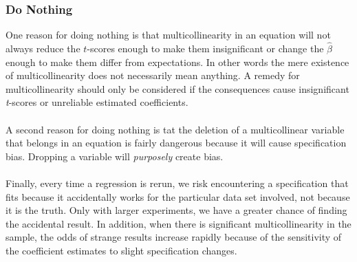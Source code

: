 \documentclass[11pt]{article}
\begin{document}
\subsubsection{Do Nothing}
One reason for doing nothing is that multicollinearity in an equation will not always reduce the $t$-scores enough to make them insignificant or change the $\hat{\beta}$ enough to make them differ from expectations. In other words the mere existence of multicollinearity does not necessarily mean anything. A remedy for multicollinearity should only be considered if the consequences cause insignificant \textit{t}-scores or unreliable estimated coefficients. \\ \\
A second reason for doing nothing is tat the deletion of a multicollinear variable that belongs in an equation is fairly dangerous because it will cause specification bias. Dropping a variable will \textit{purposely} create bias. \\ \\
Finally, every time a regression is rerun, we risk encountering a specification that fits because it accidentally works for the particular data set involved, not because it is the truth. Only with larger experiments, we have a greater chance of finding the accidental result. In addition, when there is significant multicollinearity in the sample, the odds of strange results increase rapidly because of the sensitivity of the coefficient estimates to slight specification changes.
\end{document}
